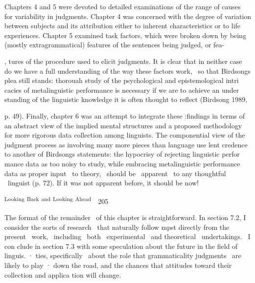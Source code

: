\begin{styleStandard}
Chapters 4 and 5 were devoted to detailed examinations of the range of causes for variability in judgments. Chapter 4 was concerned with the degree of variation between subjects and its attribution either to inherent characteristics or to life experiences. Chapter 5 examined task factors, which were broken down by being (mostly extragrammatical) features of the sentences being judged, or fea-
\end{styleStandard}


\begin{styleStandard}
, tures of the procedure used to elicit judgments. It is clear that in neither case do we have a full understanding of the way these factors work, \ so that Birdsong{\textquotesingle}s plea still stands: {\textquotedbl}thorouah study of the psychological and epistemological intri\- cacies of metalinguistic performance is necessary if we are to achieve an under\- standing of the linguistic knowledge it is often thought to reflect{\textquotedbl} (Birdsong 1989,
\end{styleStandard}


\begin{styleStandard}
p. 49). Finally, chapter 6 was an attempt to integrate these :findings in terms of an abstract view of the implied mental structures and a proposed methodology for more rigorous data collection among linguists. The componential view of the judgment process as involving many more pieces than language use lent credence to another of Birdsong{\textquotesingle}s statements: {\textquotedbl}the hypocrisy of rejecting linguistic perfor\- mance data as too noisy to study, while embracing metalinguistic performance data as proper input \ to theory, \ should be \ apparent \ to any thoughtful \ linguist{\textquotedbl} (p. 72). If it was not apparent before, it should be now!
\end{styleStandard}


\clearpage\setcounter{page}{1}\begin{styleStandard}
\textsuperscript{Looking}\textsuperscript{ }\textsuperscript{Back}\textsuperscript{ }\textsuperscript{and}\textsuperscript{ }\textsuperscript{Looking}\textsuperscript{ }\textsuperscript{Ahead{\textquotesingle}}\ \ 205
\end{styleStandard}


\begin{styleStandard}
The format of the remainder \ of this chapter is straightforward. In section 7.2, I consider the sorts of research \ that naturally follow mpst directly from the present \ work, \ including \ both \ experimental \ and theoretical \ undertakings. \ I con\- clude in section 7.3 with some speculation about the future in the field of linguis. · ties, specifically \ about the role that grammaticality judgments \ are likely to play · down the road, and the chances that attitudes toward their collection and applica\- tion will change.
\end{styleStandard}


